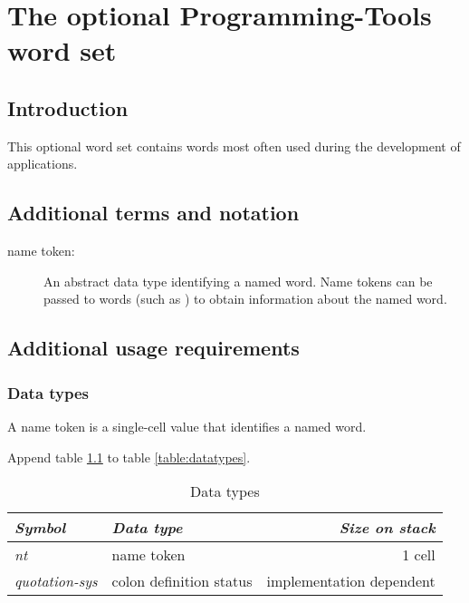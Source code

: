 
\chapter{The optional Programming-Tools word set} %

\section{Introduction} %

This optional word set contains words most often used during the
development of applications.

\section{Additional terms and notation} %
\label{tools:terms}

\begin{description}
\item[name token:]
	An abstract data type identifying a named word.  Name tokens can be passed
	to words (such as ) to obtain information about the named
	word.
\end{description}


\section{Additional usage requirements} %

\subsection{Data types} %
\label{tools:datatype}

A name token is a single-cell value that identifies a named word.

Append table \ref{tools:types} to table \ref{table:datatypes}.

\begin{table}[h]
  \begin{center}
	\caption{Data types}
	\label{tools:types}
	\begin{tabular}{llr}
	\hline\hline
	\emph{Symbol} & \emph{Data type} & \emph{Size on stack} \\
	\hline
	\emph{nt}				& name token				& 1 cell \\
	\emph{quotation-sys}	& colon definition status	& implementation dependent \\
	\hline\hline
	\end{tabular}
  \end{center}
\end{table}

